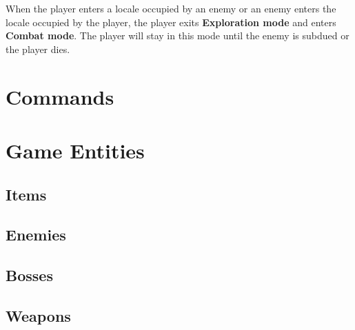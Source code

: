 \documentclass[11pt]{article}
\begin{document}
	When the player enters a locale occupied by an enemy or an enemy enters the locale occupied by the player, the player exits \textbf{Exploration mode} and enters \textbf{Combat mode}. The player will stay in this mode until the enemy is subdued or the player dies.
	
	\section{Commands}
	
	\section{Game Entities}
	\subsection{Items}
	
	\subsection{Enemies}
	
	\subsection{Bosses}
	
	\subsection{Weapons}
	
\end{document}
